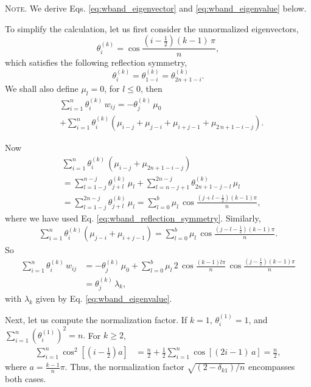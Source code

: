 \documentclass[reprint, floatfix]{revtex4-1}
\newcommand{\note}[1]{{\color{DarkGreen}\footnotesize \textsc{Note.} #1}}
\begin{document}
\note{We derive Eqs.
  \eqref{eq:wband_eigenvector} and \eqref{eq:wband_eigenvalue}
  below.

  To simplify the calculation,
  let us first consider the unnormalized eigenvectors,
  $$
  \theta^{(k)}_i
  =
  \cos \frac{ \left( i - \frac 1 2 \right) (k - 1) \, \pi}{n},
  $$
  which satisfies the following reflection symmetry,
  \begin{equation}
    \theta^{(k)}_i = \theta^{(k)}_{1 - i} = \theta^{(k)}_{ 2 n + 1 - i }.
    \label{eq:wband_reflection_symmetry}
  \end{equation}
  We shall also define $\mu_l = 0$, for $l \le 0$, then
$$
\begin{aligned}
&\sum_{i = 1}^n
  \theta^{(k)}_i
  \, w_{ij}
=
- \theta^{(k)}_j \, \mu_0
\\
&
+\sum_{i = 1}^n
  \theta^{(k)}_i
  \left(
    \mu_{i - j} + \mu_{j - i} + \mu_{i + j - 1} + \mu_{2 \, n + 1 - i - j}
  \right)
.
\end{aligned}
$$

Now
$$
\begin{aligned}
  &
  \sum_{i = 1}^n
  \theta^{(k)}_i \,
  \left(
    \mu_{i - j} + \mu_{ 2 n + 1 - i - j }
  \right)
  \\
  &=
  \sum_{l=1-j}^{n-j} \theta^{(k)}_{j+l} \, \mu_l
  +
  \sum_{l = n-j+1}^{2n-j} \theta^{(k)}_{2n+1-j-l} \, \mu_l
  \\
  &=
  \sum_{l=1-j}^{2n-j} \theta^{(k)}_{j+l} \, \mu_l
  =
  \sum_{l=0}^{b} \mu_l \, \cos\frac{(j+l-\frac12)(k-1)\pi}{n},
\end{aligned}
$$
where we have used Eq. \eqref{eq:wband_reflection_symmetry}.
%
Similarly,
$$
\begin{aligned}
  \sum_{i = 1}^n
  \theta^{(k)}_i
  \left(
    \mu_{j - i} + \mu_{i+j-1}
  \right)
  =
  \sum_{l=0}^{b} \mu_l \, \cos\frac{(j-l-\frac12)(k-1)\pi}{n}.
\end{aligned}
$$
%
So
$$
\begin{aligned}
\sum_{i = 1}^n \theta^{(k)}_i \, w_{ij}
&=
- \theta^{(k)}_j \, \mu_0
+\sum_{l=0}^{b} \mu_l \, 2 \, \cos\frac{(k-1)l\pi}{n} \, \cos\frac{(j-\frac12)(k-1)\pi}{n}
\\
&= \theta^{(k)}_j \, \lambda_k,
\end{aligned}
$$
with $\lambda_k$ given by Eq. \eqref{eq:wband_eigenvalue}.

Next, let us compute the normalization factor.
%
If $k = 1$, $\theta^{(1)}_i = 1$, and
$
\sum_{i = 1}^n \left( \theta^{(1)}_i \right)^2 = n.
$
For $k \ge 2$,
$$
\begin{aligned}
  \sum_{i = 1}^n \cos^2 \left[\left(i - \frac1 2 \right) a\right]
  &=
  \frac n 2
  +
  \frac 1 2
  \sum_{i = 1}^n \cos\left[(2 i - 1)\, a \right]
  =
  \frac n 2,
\end{aligned}
$$
where $a = \frac{k-1}{n} \pi$.
Thus, the normalization factor $\sqrt{(2 - \delta_{k1})/n}$
encompasses both cases.

}
\end{document}
